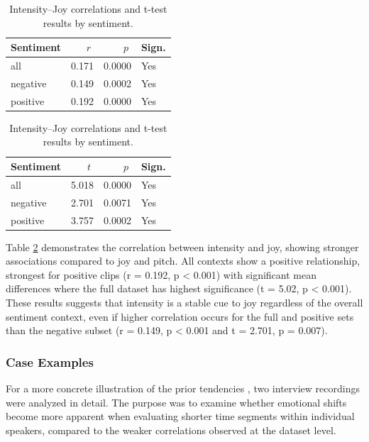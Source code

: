  \begin{table}[H]
    \centering
  
    \begin{subtable}{0.45\textwidth}
      \centering
      \caption{Intensity and Joy (r)}\label{tab:rq1_corr_intensity_joy}
      \begin{tabular}{l r r l}
        \toprule
        Sentiment & \(\;r\;\) & \(\;p\;\) & Sign. \\
        \midrule
        all      & 0.171 & 0.0000 & Yes \\
        negative & 0.149 & 0.0002 & Yes \\
        positive & 0.192 & 0.0000 & Yes \\
        \bottomrule
      \end{tabular}
    \end{subtable}\hfill
    \begin{subtable}{0.45\textwidth}
      \centering
      \caption{Intensity and Joy (t-test)}\label{tab:rq1_ttest_intensity_joy}
      \begin{tabular}{l r r l}
        \toprule
        Sentiment & \(\;t\;\) & \(\;p\;\) & Sign. \\
        \midrule
        all      & 5.018 & 0.0000 & Yes \\
        negative & 2.701 & 0.0071 & Yes \\
        positive & 3.757 & 0.0002 & Yes \\
        \bottomrule
      \end{tabular}
    \end{subtable}
  
    \caption{Intensity–Joy correlations and t-test results by sentiment.}
    \label{tab:rq1_intensity_joy_side_by_side}
  \end{table}
Table \ref{tab:rq1_intensity_joy_side_by_side} demonstrates the correlation between intensity and joy, showing stronger associations compared to joy and pitch. 
All contexts show a positive relationship, strongest for positive clips (r = 0.192, p < 0.001) with significant mean differences where the full dataset has highest significance (t = 5.02, p < 0.001). 
These results suggests that intensity is a stable cue to joy regardless of the overall sentiment context, even if higher correlation occurs for the full and positive sets than the negative subset (r = 0.149, p < 0.001 and t = 2.701, p = 0.007). 


\subsubsection{Case Examples}
For a more concrete illustration of the prior tendencies , two interview recordings were analyzed in detail. The purpose was to examine whether emotional shifts become more apparent when evaluating shorter time segments within individual speakers, compared to the weaker correlations observed at the dataset level.

